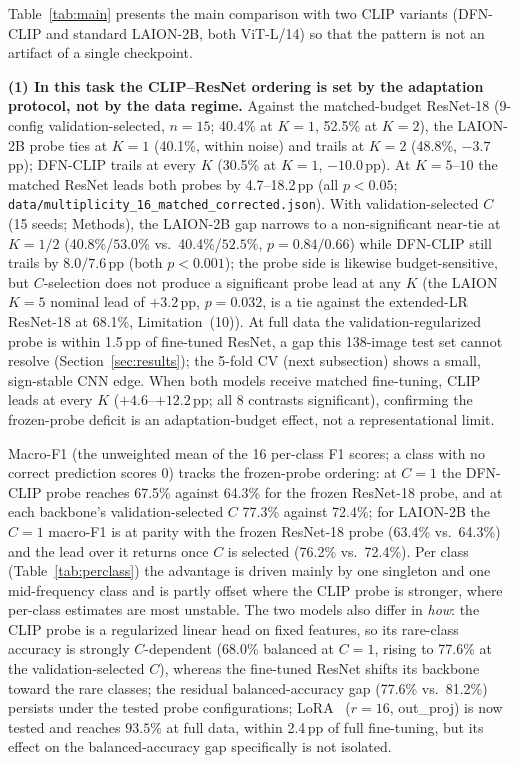 \documentclass[10pt,a4paper]{article}
\begin{document}
Table~\ref{tab:main} presents the main comparison with two CLIP variants (DFN-CLIP and standard LAION-2B, both ViT-L/14) so that the pattern is not an artifact of a single checkpoint.

\textbf{(1) In this task the CLIP--ResNet ordering is set by the adaptation protocol, not by the data regime.} Against the matched-budget ResNet-18 (9-config validation-selected, $n{=}15$; 40.4\% at $K{=}1$, 52.5\% at $K{=}2$), the LAION-2B probe ties at $K{=}1$ (40.1\%, within noise) and trails at $K{=}2$ (48.8\%, $-3.7$\,pp); DFN-CLIP trails at every $K$ (30.5\% at $K{=}1$, $-10.0$\,pp). At $K{=}5$--$10$ the matched ResNet leads both probes by 4.7--18.2\,pp (all $p<0.05$; \texttt{data/multiplicity\_16\_matched\_corrected.json}). With validation-selected $C$ (15 seeds; Methods), the LAION-2B gap narrows to a non-significant near-tie at $K{=}1/2$ (40.8\%/$53.0\%$ vs.\ 40.4\%/$52.5\%$, $p{=}0.84/0.66$) while DFN-CLIP still trails by $8.0/7.6$\,pp (both $p{<}0.001$); the probe side is likewise budget-sensitive, but $C$-selection does not produce a significant probe lead at any $K$ (the LAION $K{=}5$ nominal lead of $+3.2$\,pp, $p{=}0.032$, is a tie against the extended-LR ResNet-18 at 68.1\%, Limitation~(10)). At full data the validation-regularized probe is within 1.5\,pp of fine-tuned ResNet, a gap this 138-image test set cannot resolve (Section~\ref{sec:results}); the 5-fold CV (next subsection) shows a small, sign-stable CNN edge. When both models receive matched fine-tuning, CLIP leads at every $K$ ($+4.6$--$+12.2$\,pp; all 8 contrasts significant), confirming the frozen-probe deficit is an adaptation-budget effect, not a representational limit.

Macro-F1 (the unweighted mean of the 16 per-class F1 scores; a class with no correct prediction scores 0) tracks the frozen-probe ordering: at $C{=}1$ the DFN-CLIP probe reaches 67.5\% against 64.3\% for the frozen ResNet-18 probe, and at each backbone's validation-selected $C$ 77.3\% against 72.4\%; for LAION-2B the $C{=}1$ macro-F1 is at parity with the frozen ResNet-18 probe (63.4\% vs.\ 64.3\%) and the lead over it returns once $C$ is selected (76.2\% vs.\ 72.4\%). Per class (Table~\ref{tab:perclass}) the advantage is driven mainly by one singleton and one mid-frequency class and is partly offset where the CLIP probe is stronger, where per-class estimates are most unstable. The two models also differ in \emph{how}: the CLIP probe is a regularized linear head on fixed features, so its rare-class accuracy is strongly $C$-dependent (68.0\% balanced at $C{=}1$, rising to 77.6\% at the validation-selected $C$), whereas the fine-tuned ResNet shifts its backbone toward the rare classes; the residual balanced-accuracy gap (77.6\% vs.\ 81.2\%) persists under the tested probe configurations; LoRA~\cite{hu2022lora} ($r{=}16$, out\_proj) is now tested and reaches $93.5\%$ at full data, within 2.4\,pp of full fine-tuning, but its effect on the balanced-accuracy gap specifically is not isolated.
\end{document}
